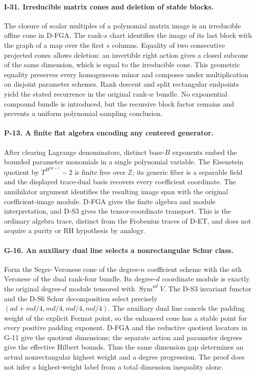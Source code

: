 \paragraph{I-31. Irreducible matrix cones and deletion of stable blocks.}
The closure of scalar multiples of a polynomial matrix image is an
irreducible affine cone in D-FGA. The rank-$s$ chart identifies the
image of its last block with the graph of a map over the first $s$
columns. Equality of two consecutive projected cones allows deletion:
an invertible right action gives a closed subcone of the same dimension,
which is equal to the irreducible cone. This geometric equality
preserves every homogeneous minor and composes under multiplication
on disjoint parameter schemes. Rank descent and split rectangular
endpoints yield the stated recurrence in the original rank-$w$ bundle.
No exponential compound bundle is introduced, but the recursive block
factor remains and prevents a uniform polynomial sampling conclusion.

\paragraph{P-13. A finite flat algebra encoding any centered generator.}
After clearing Lagrange denominators, distinct base-$B$ exponents embed
the bounded parameter monomials in a single polynomial variable. The
Eisenstein quotient by $T^{B^{2K+1}}-2$ is finite free over
$\mathbb Z$; its generic fiber is a separable field and the displayed
trace-dual basis recovers every coefficient coordinate. The
annihilator argument identifies the resulting image span with the
original coefficient-image module. D-FGA gives the finite algebra and
module interpretation, and D-S3 gives the tensor-coordinate transport.
This is the ordinary algebra trace, distinct from the Frobenius traces
of D-ET, and does not acquire a purity or RH hypothesis by analogy.


\paragraph{G-16. An auxiliary dual line selects a nonrectangular Schur class.}
Form the Segre--Veronese cone of the degree-$n$ coefficient scheme with
the $a$th Veronese of the dual rank-four bundle. Its degree-$d$
coordinate module is exactly the original degree-$d$ module tensored
with $\operatorname{Sym}^{ad}V$. The D-S3 invariant functor and the
D-S6 Schur decomposition select precisely
$(ad+md/4,md/4,md/4,md/4)$. The auxiliary dual line cancels the padding
weight of the explicit Fermat point, so the enhanced cone has a stable
point for every positive padding exponent. D-FGA and the reductive
quotient locators in G-11 give the quotient dimensions; the separate
action and parameter degrees give the effective Hilbert bounds.
Thus the same dimension gap determines an actual nonrectangular
highest weight and a degree progression. The proof does not infer a
highest-weight label from a total dimension inequality alone.


